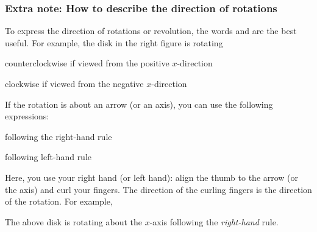 \documentclass[11pt,pdfa,lastpage]{MishoNote}
\begin{document}
\subsubsection{Extra note: How to describe the direction of rotations}
\begin{minipage}[b]{0.66\textwidth}
To express the direction of rotations or revolution, the words  and  are the best useful.
For example, the disk in the right figure is rotating
\begin{miniitemize}
  \item counterclockwise if viewed from the positive $x$-direction
  \item clockwise if viewed from the negative $x$-direction
\end{miniitemize}

If the rotation is about an arrow (or an axis), you can use the following expressions:
\end{minipage}\hfill
\begin{minipage}[b]{0.32\textwidth}
\end{minipage}
\begin{miniitemize}
  \item following the right-hand rule
  \item following left-hand rule
\end{miniitemize}
Here, you use your right hand (or left hand): align the thumb to the arrow (or the axis) and curl your fingers. The direction of the curling fingers is the direction of the rotation. For example,

\begin{miniitemize}
  \item The above disk is rotating about the $x$-axis following the \emph{right-hand} rule.
\end{miniitemize}
\end{document}
